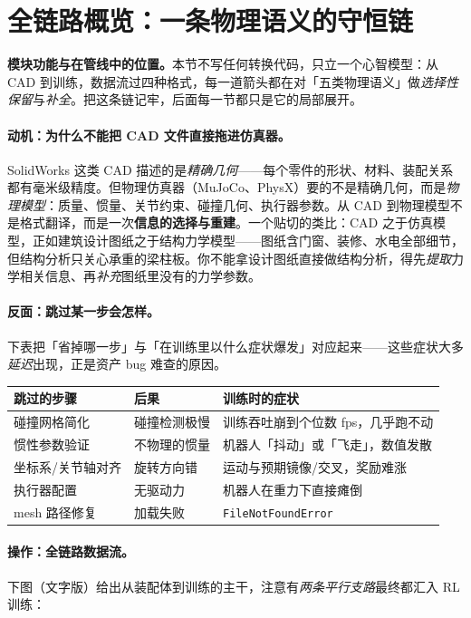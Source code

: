 \section{全链路概览：一条物理语义的守恒链}
\label{sec:rlmc-assets-overview}

\textbf{模块功能与在管线中的位置。}本节不写任何转换代码，只立一个心智模型：从 CAD 到训练，数据流过四种格式，每一道箭头都在对「五类物理语义」做\emph{选择性保留}与\emph{补全}。把这条链记牢，后面每一节都只是它的局部展开。

\paragraph{动机：为什么不能把 CAD 文件直接拖进仿真器。}SolidWorks 这类 CAD 描述的是\emph{精确几何}——每个零件的形状、材料、装配关系都有毫米级精度。但物理仿真器（MuJoCo、PhysX）要的不是精确几何，而是\emph{物理模型}：质量、惯量、关节约束、碰撞几何、执行器参数。从 CAD 到物理模型不是格式翻译，而是一次\textbf{信息的选择与重建}。一个贴切的类比：CAD 之于仿真模型，正如建筑设计图纸之于结构力学模型——图纸含门窗、装修、水电全部细节，但结构分析只关心承重的梁柱板。你不能拿设计图纸直接做结构分析，得先\emph{提取}力学相关信息、再\emph{补充}图纸里没有的力学参数。

\paragraph{反面：跳过某一步会怎样。}下表把「省掉哪一步」与「在训练里以什么症状爆发」对应起来——这些症状大多\emph{延迟}出现，正是资产 bug 难查的原因。

\begin{center}
\small
\begin{tabular}{@{}lll@{}}
\toprule
跳过的步骤 & 后果 & 训练时的症状 \\
\midrule
碰撞网格简化 & 碰撞检测极慢 & 训练吞吐崩到个位数 fps，几乎跑不动 \\
惯性参数验证 & 不物理的惯量 & 机器人「抖动」或「飞走」，数值发散 \\
坐标系/关节轴对齐 & 旋转方向错 & 运动与预期镜像/交叉，奖励难涨 \\
执行器配置 & 无驱动力 & 机器人在重力下直接瘫倒 \\
mesh 路径修复 & 加载失败 & \texttt{FileNotFoundError} \\
\bottomrule
\end{tabular}
\end{center}

\paragraph{操作：全链路数据流。}下图（文字版）给出从装配体到训练的主干，注意有\emph{两条平行支路}最终都汇入 RL 训练：


